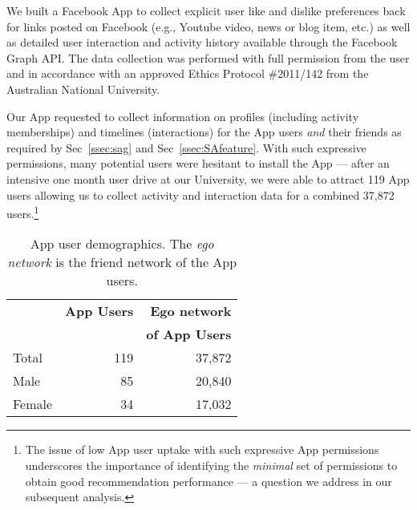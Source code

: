 
We built a Facebook App to collect explicit user like and dislike 
preferences back for links posted on Facebook (e.g., Youtube video,
news or blog item, etc.) as well as detailed user interaction and
activity history available through the Facebook Graph API.
The data collection was performed with full permission from the user
and in accordance with an approved Ethics Protocol 
\#2011/142 from the Australian National University.

Our App requested to collect information on profiles (including
activity memberships) and timelines (interactions) for the App
users \emph{and} their friends as required by Sec~\ref{ssec:sag} and
Sec~\ref{ssec:SAfeature}.  With such expressive permissions, many
potential users were hesitant to install the App --- after an
intensive one month user drive at our University, we were able to
attract 119 App users allowing us to collect activity and interaction
data for a combined 37,872 users.\footnote{The issue of low App user
uptake with such expressive App permissions underscores the importance
of identifying the \emph{minimal} set of permissions to obtain good
recommendation performance --- a question we address in our subsequent
analysis.}


\begin{table}[t!]
\centering
\begin{tabular}{|>{\small}l|>{\small}r|>{\small}r|}
\hline
& \textbf{App Users} & \textbf{Ego network} \\
& & \textbf{of App Users} \\
\hline
Total & 119 & 37,872 \\
\hline \hline
Male & 85 & 20,840 \\
\hline
Female & 34 & 17,032 \\
\hline
\end{tabular}
\caption{App user demographics.  The \emph{ego network} is the friend
network of the App users.}
\label{tab:demographics}
\end{table}

